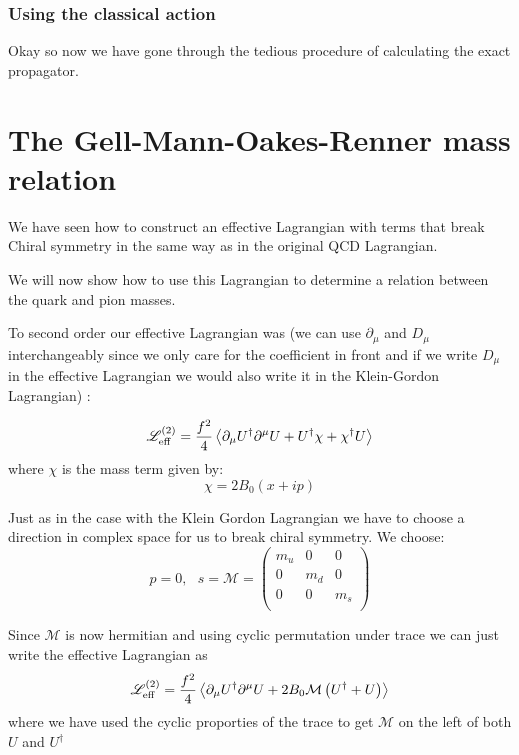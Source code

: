 \documentclass[a4,10pt,titlepage]{article}
\renewcommand\[{\begin{equation*}}
\renewcommand\]{\end{equation*}}
\newcommand{\be}{\begin{equation}}
\newcommand{\ee}{\end{equation}}
\numberwithin{equation}{section}
\newcommand{\lp}{\left}
\newcommand{\rp}{\right}
\newcommand{\Lar}{\mathscr{L}}
\begin{document}
\subsubsection{Using the classical action}
Okay so now we have gone through the tedious procedure of calculating the exact propagator. 
\section{The Gell-Mann-Oakes-Renner mass relation}
We have seen how to construct an effective Lagrangian with terms that break Chiral symmetry in the same way as in the original QCD Lagrangian. 

We will now show how to use this Lagrangian to determine a relation between the quark and pion masses.

To second order our effective Lagrangian was (we can use $\partial_\mu$ and $D_\mu$ interchangeably since we only care for the coefficient in front and if we write $D_\mu$ in the effective Lagrangian we would also write it in the Klein-Gordon Lagrangian) : 

\be
\Lar_{\text{eff}}^{(2)}=\frac{f^2}{4}\expval{\partial_\mu U^\dagger \partial^\mu U+U^\dagger\chi+\chi^\dagger U}
\ee
where $\chi$ is the mass term given by:
\be
\chi=2B_0\lp(x+ip\rp)
\ee

Just as in the case with the Klein Gordon Lagrangian we have to choose a direction in complex space for us to break chiral symmetry. We choose:
\be
p=0,\:\:\:s=\mathcal{M}=
\begin{pmatrix}
m_u & 0 & 0\\
0 & m_d & 0\\
0 & 0 & m_s\\
\end{pmatrix}
\ee

Since $\mathcal{M}$ is now hermitian and using cyclic permutation under trace we can just write the effective Lagrangian as
\be \label{eq:GSLar}
\Lar_{\text{eff}}^{(2)}=\frac{f^2}{4}\expval{\partial_\mu U^\dagger \partial^\mu U +2B_0\mathcal{M}\lp( U^\dagger+U \rp)}
\ee
where we have used the cyclic proporties of the trace to get $\mathcal{M}$ on the left of both $U$ and $U^\dagger$
\end{document}
